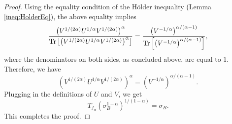 \documentclass{article}
\begin{document}
\begin{proof}
    Using the equality condition of the H\"{o}lder inequality (Lemma \ref{ineq:HolderEq}), the above equality implies
    \begin{align}
        \frac{\left( V^{ 1/(2\alpha) } U^{ 1/\alpha } V^{ 1/(2\alpha) }\right)^\alpha}{\Tr\left[\left( V^{ 1/(2\alpha) } U^{ 1/\alpha } V^{ 1/(2\alpha) }\right)^\alpha\right]}
        =\frac{\left( V^{ -1/\alpha } \right)^{\alpha/(\alpha-1)}}{\Tr\left[ \left( V^{ -1/\alpha } \right)^{\alpha/(\alpha-1)} \right]},
    \end{align}
    where the denominators on both sides, as concluded above, are equal to $1$.
    Therefore, we have  
    \[
    \left( V^{ 1/(2\alpha) } U^{ 1/\alpha } V^{ 1/(2\alpha) }\right)^\alpha=\left( V^{ -1/\alpha } \right)^{\alpha/(\alpha-1)} . 
    \]
    Plugging in the definitions of $U$ and $V$, we get 
    \[
    T_{f_{\alpha}}\left(\sigma_B^{1-\alpha}\right)^{1/(1-\alpha)}=\sigma_B . 
    \]
    This completes the proof. 
\end{proof}
\end{document}
